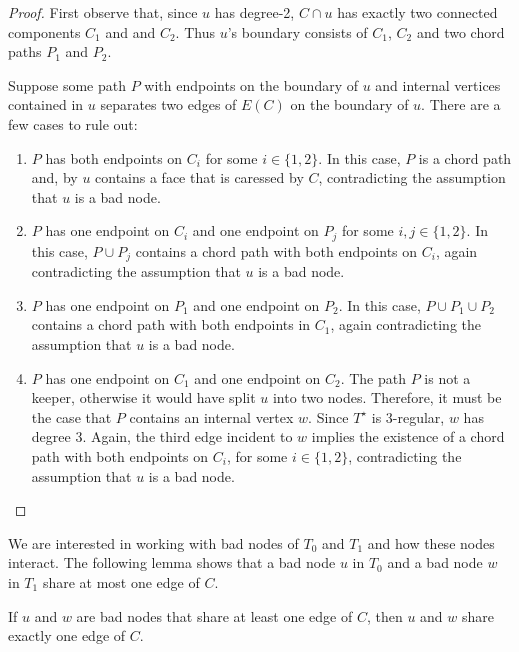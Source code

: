 \documentclass{patmorin}
\newcommand{\dual}[1]{{#1}^\star}
\begin{document}
\begin{proof}
   First observe that, since $u$ has degree-2, $C\cap u$ has exactly
   two connected components $C_1$ and and $C_2$. Thus $u$'s boundary
   consists of $C_1$, $C_2$ and two chord paths $P_1$ and $P_2$.

   Suppose some path $P$ with endpoints on the boundary of $u$ and
   internal vertices contained in $u$ separates two edges of $E(C)$
   on the boundary of $u$.  There are a few cases to rule out:
   \begin{enumerate}
       \item $P$ has both endpoints on $C_i$ for some $i\in\{1,2\}$. In
       this case, $P$ is a chord path and, by 
       $u$ contains a face that is caressed by $C$, contradicting the
       assumption that $u$ is a bad node.

       \item $P$ has one endpoint on $C_i$ and one endpoint on $P_j$
       for some $i,j\in\{1,2\}$.  In this case, $P\cup P_j$ contains a
       chord path with both endpoints on $C_i$, again contradicting the
       assumption that $u$ is a bad node.

       \item $P$ has one endpoint on $P_1$ and one endpoint on $P_2$.
       In this case, $P\cup P_1\cup P_2$ contains a chord path with both
       endpoints in $C_1$, again contradicting the assumption that $u$
       is a bad node.

       \item $P$ has one endpoint on $C_1$ and one endpoint on $C_2$.
       The path $P$ is not a keeper, otherwise it would have split $u$
       into two nodes.  Therefore, it must be the case that $P$ contains
       an internal vertex $w$. Since $\dual{T}$ is 3-regular, $w$ has
       degree 3.  Again, the third edge incident to $w$ implies the
       existence of a chord path with both endpoints on $C_i$, for some
       $i\in\{1,2\}$, contradicting the assumption that $u$ is a bad node.
\end{enumerate}
\end{proof}

We are interested in working with bad nodes of $T_0$ and $T_1$ and how
these nodes interact.  The following lemma shows that a bad node $u$ in $T_0$
and a bad node $w$ in $T_1$ share at most one edge of $C$.

\begin{lem}
   If $u$ and $w$ are bad nodes that share at least one edge of $C$, then
   $u$ and $w$ share exactly one edge of $C$.
\end{lem}
\end{document}
